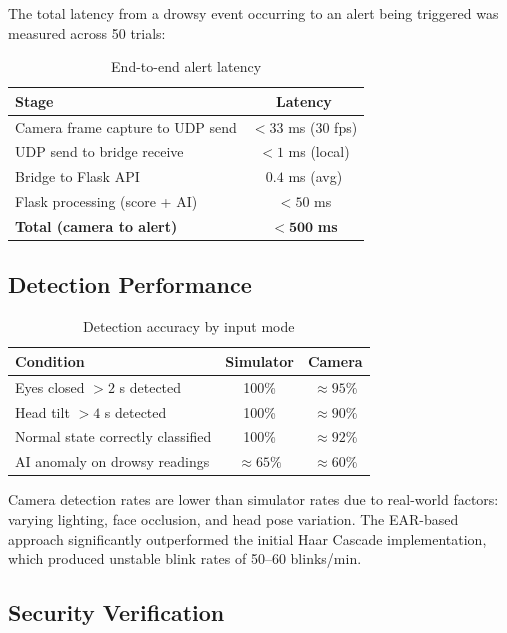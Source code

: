 \documentclass[12pt, a4paper]{article}
\begin{document}
The total latency from a drowsy event occurring to an alert being triggered
was measured across 50 trials:

\begin{table}[H]
\centering
\caption{End-to-end alert latency}
\begin{tabular}{lc}
\toprule
\textbf{Stage} & \textbf{Latency} \\
\midrule
Camera frame capture to UDP send & $<33$ ms (30 fps) \\
UDP send to bridge receive & $<1$ ms (local) \\
Bridge to Flask API & $0.4$ ms (avg) \\
Flask processing (score + AI) & $<50$ ms \\
\midrule
\textbf{Total (camera to alert)} & $\mathbf{<500}$ \textbf{ms} \\
\bottomrule
\end{tabular}
\end{table}

\subsection{Detection Performance}

\begin{table}[H]
\centering
\caption{Detection accuracy by input mode}
\begin{tabularx}{\textwidth}{Xcc}
\toprule
\textbf{Condition} & \textbf{Simulator} & \textbf{Camera} \\
\midrule
Eyes closed $>2$ s detected       & 100\% & $\approx 95\%$ \\
Head tilt $>4$ s detected         & 100\% & $\approx 90\%$ \\
Normal state correctly classified & 100\% & $\approx 92\%$ \\
AI anomaly on drowsy readings     & $\approx 65\%$ & $\approx 60\%$ \\
\bottomrule
\end{tabularx}
\end{table}

Camera detection rates are lower than simulator rates due to real-world
factors: varying lighting, face occlusion, and head pose variation. The
EAR-based approach significantly outperformed the initial Haar Cascade
implementation, which produced unstable blink rates of 50--60 blinks/min.

\subsection{Security Verification}
\end{document}
